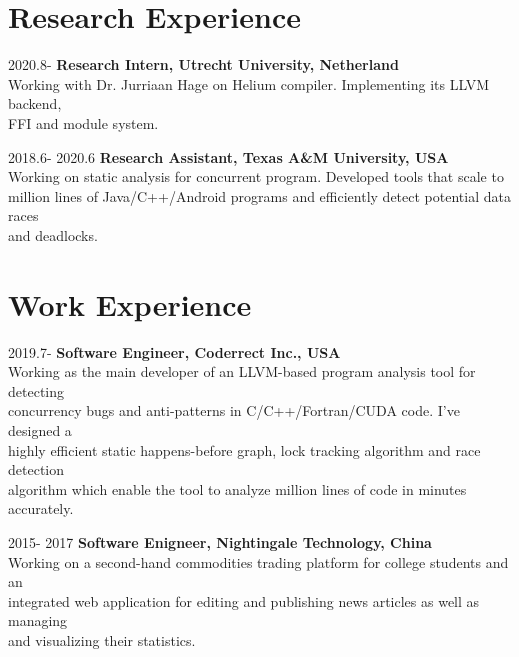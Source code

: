 \documentclass[12pt,letterpaper]{report}
\newcommand{\listtabwidth}{1.75cm}
\begin{document}
\renewcommand{\listtabwidth}{2.5cm}
	\section*{Research Experience}

	\begin{tablist}[style=multiline, leftmargin=*]
		\item[2020.8-]
		\tab \textbf{Research Intern, Utrecht University, Netherland}\\
		\tab Working with Dr. Jurriaan Hage on Helium compiler. Implementing its LLVM backend,\\
		\tab FFI and module system.
		\item[2018.6- 2020.6]
		\tab \textbf{Research Assistant, Texas A\&M University, USA}\\
		\tab Working on static analysis for concurrent program. Developed tools that scale to \\
		\tab million lines of Java/C++/Android programs and efficiently detect potential data races\\
		\tab and deadlocks.
	\end{tablist}

 	\section*{Work Experience}
	
	\begin{tablist}[style=multiline, leftmargin=*]
		\item[2019.7-]
		\tab \textbf{Software Engineer, Coderrect Inc., USA}\\
		\tab Working as the main developer of an LLVM-based program analysis tool for detecting\\
		\tab concurrency bugs and anti-patterns in C/C++/Fortran/CUDA code. I've designed a\\
		\tab highly efficient static happens-before graph, lock tracking algorithm and race detection\\
		\tab algorithm which enable the tool to analyze million lines of code in minutes accurately.
		\item[2015- 2017]
		\tab \textbf{Software Enigneer, Nightingale Technology, China}\\
		\tab Working on a second-hand commodities trading platform for college students and an\\
		\tab integrated web application for editing and publishing news articles as well as managing\\
		\tab and visualizing their statistics.
	\end{tablist}
\end{document}
